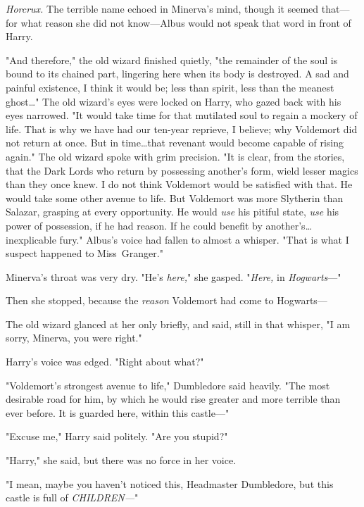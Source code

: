 \emph{Horcrux.} The terrible name echoed in Minerva's mind, though it seemed
that—for what reason she did not know—Albus would not speak that word in
front of Harry.

"And therefore," the old wizard finished quietly, "the remainder of the soul is
bound to its chained part, lingering here when its body is destroyed. A sad and
painful existence, I think it would be; less than spirit, less than the meanest
ghost…" The old wizard's eyes were locked on Harry, who gazed back with
his eyes narrowed. "It would take time for that mutilated soul to regain a
mockery of life. That is why we have had our ten-year reprieve, I believe; why
Voldemort did not return at once. But in time…that revenant would
become capable of rising again." The old wizard spoke with grim precision. "It
is clear, from the stories, that the Dark Lords who return by possessing
another's form, wield lesser magics than they once knew. I do not think
Voldemort would be satisfied with that. He would take some other avenue to
life. But Voldemort was more Slytherin than Salazar, grasping at every
opportunity. He would \emph{use} his pitiful state, \emph{use} his power of
possession, if he had reason. If he could benefit by another's…inexplicable
fury." Albus's voice had fallen to almost a whisper. "That is what
I suspect happened to Miss~Granger."

Minerva's throat was very dry. "He's \emph{here,}" she gasped. "\emph{Here,} in
\emph{Hogwarts}—"

Then she stopped, because the \emph{reason} Voldemort had come to Hogwarts—

The old wizard glanced at her only briefly, and said, still in that whisper, "I
am sorry, Minerva, you were right."

Harry's voice was edged. "Right about what?"

"Voldemort's strongest avenue to life," Dumbledore said heavily. "The most
desirable road for him, by which he would rise greater and more terrible than
ever before. It is guarded here, within this castle—"

"Excuse me," Harry said politely. "Are you stupid?"

"Harry," she said, but there was no force in her voice.

"I mean, maybe you haven't noticed this, Headmaster Dumbledore, but this castle
is full of \emph{CHILDREN—}"

